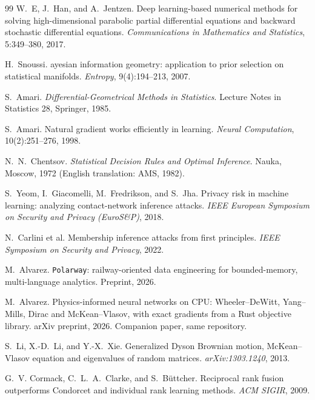 \documentclass[11pt,a4paper]{article}
\theoremstyle{plain}
\theoremstyle{definition}
\begin{document}
\begin{thebibliography}{99}
W.~E, J.~Han, and A.~Jentzen.
\newblock Deep learning-based numerical methods for solving high-dimensional
parabolic partial differential equations and backward stochastic
differential equations.
\newblock \emph{Communications in Mathematics and Statistics}, 5:349--380,
2017.

H.~Snoussi.
ayesian information geometry: application to prior selection
on statistical manifolds.
\newblock \emph{Entropy}, 9(4):194--213, 2007.

S.~Amari.
\newblock \emph{Differential-Geometrical Methods in Statistics}.
\newblock Lecture Notes in Statistics 28, Springer, 1985.

S.~Amari.
\newblock Natural gradient works efficiently in learning.
\newblock \emph{Neural Computation}, 10(2):251--276, 1998.

N.~N.~Chentsov.
\newblock \emph{Statistical Decision Rules and Optimal Inference}.
\newblock Nauka, Moscow, 1972 (English translation: AMS, 1982).


S.~Yeom, I.~Giacomelli, M.~Fredrikson, and S.~Jha.
\newblock Privacy risk in machine learning: analyzing contact-network
inference attacks.
\newblock \emph{IEEE European Symposium on Security and Privacy (EuroS\&P)},
2018.

N.~Carlini et al.
\newblock Membership inference attacks from first principles.
\newblock \emph{IEEE Symposium on Security and Privacy}, 2022.


M.~Alvarez.
\newblock \texttt{Polarway}: railway-oriented data engineering for
bounded-memory, multi-language analytics.
\newblock Preprint, 2026.

M.~Alvarez.
\newblock Physics-informed neural networks on CPU: Wheeler--DeWitt,
Yang--Mills, Dirac and McKean--Vlasov, with exact gradients from a Rust
objective library.
\newblock arXiv preprint, 2026. Companion paper, same repository.

S.~Li, X.-D.~Li, and Y.-X.~Xie.
\newblock Generalized Dyson Brownian motion, McKean--Vlasov equation and
eigenvalues of random matrices.
\newblock \emph{arXiv:1303.1240}, 2013.

G.~V. Cormack, C.~L.~A.~Clarke, and S.~B\"uttcher.
\newblock Reciprocal rank fusion outperforms Condorcet and individual rank
learning methods.
\newblock \emph{ACM SIGIR}, 2009.

\end{thebibliography}
\end{document}
